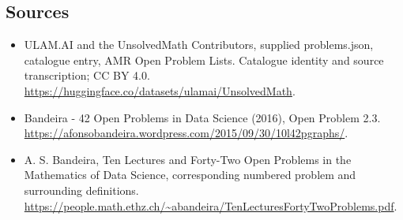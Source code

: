 \documentclass[11pt,a4paper]{article}
\begin{document}
\subsection{Sources}
\begin{itemize}
\item[S1] ULAM.AI and the UnsolvedMath Contributors, supplied problems.json, catalogue entry, AMR Open Problem Lists. Catalogue identity and source transcription; CC BY 4.0.
\url{https://huggingface.co/datasets/ulamai/UnsolvedMath}.
\item[S2] Bandeira - 42 Open Problems in Data Science (2016), Open Problem 2.3. 
\url{https://afonsobandeira.wordpress.com/2015/09/30/10l42pgraphs/}.
\item[S3] A. S. Bandeira, Ten Lectures and Forty-Two Open Problems in the Mathematics of Data Science, corresponding numbered problem and surrounding definitions.
\url{https://people.math.ethz.ch/~abandeira/TenLecturesFortyTwoProblems.pdf}.
\end{itemize}
\end{document}
